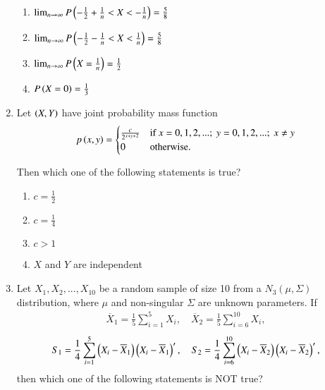 \documentclass[journal,12pt,onecolumn]{IEEEtran}
\theoremstyle{remark}
\begin{document}
\begin{enumerate}
\begin{enumerate}
\item $\lim_{n \to \infty} P\left(-\frac{1}{2} + \frac{1}{n} < X < -\frac{1}{n}\right) = \frac{5}{8}$
\item $\lim_{n \to \infty} P\left(-\frac{1}{2} - \frac{1}{n} < X < \frac{1}{n}\right) = \frac{5}{8}$
\item $\lim_{n \to \infty} P\left(X = \frac{1}{n}\right) = \frac{1}{2}$
\item $P\left(X = 0\right) = \frac{1}{3}$\\
\end{enumerate}
\item Let $\left(X,Y\right)$ have joint probability mass function
\begin{align}p\left(x,y\right) = \begin{cases}
    \frac{c}{2^{x+y+2}} & \text{if } x = 0, 1, 2, ...; \ y = 0, 1, 2, ...; \ x \neq y \\
    0 & \text{otherwise.}
\end{cases}\end{align}

Then which one of the following statements is true?

\begin{enumerate}
\item $c = \frac{1}{2}$
\item $c = \frac{1}{4}$
\item $c > 1$
\item $X$ and $Y$ are independent
\end{enumerate}
\item Let $X_1, X_2, ..., X_{10}$ be a random sample of size 10 from a $N_3(\mu, \Sigma)$ distribution, where $\mu$ and non-singular $\Sigma$ are unknown parameters. If 
\begin{align}\overline{X}_1 = \frac{1}{5}\sum_{i=1}^{5}X_i, \quad \overline{X}_2 = \frac{1}{5}\sum_{i=6}^{10}X_i,\end{align}
\begin{align}S_1 = \frac{1}{4}\sum_{i=1}^{5}\left(X_i - \overline{X}_1\right)\left(X_i - \overline{X}_1\right)^\prime, \quad S_2 = \frac{1}{4}\sum_{i=6}^{10}\left(X_i - \overline{X}_2\right)\left(X_i - \overline{X}_2\right)^\prime,\end{align}
then which one of the following statements is NOT true?


\end{enumerate}
\end{document}
